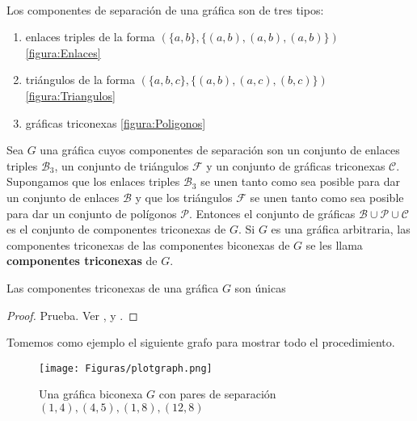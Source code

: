 \paragraph{}
Los componentes de separación de una gráfica son de tres tipos: 
\begin{enumerate}
\item enlaces triples de la forma $\left(\{a, b\}, \{\left(a, b\right),\left(a, b\right),\left(a, b\right)\} \right)$ \ref{figura:Enlaces}
\item triángulos de la forma $\left(\{a, b, c\}, \{\left(a, b\right),\left(a, c\right),\left(b, c\right)\}\right)$ \ref{figura:Triangulos}
\item gráficas triconexas \ref{figura:Poligonos}
\end{enumerate}
Sea $G$ una gráfica cuyos componentes de separación son un conjunto de enlaces triples $\mathscr{B}_{3}$, un conjunto de triángulos $\mathscr{F}$ y un conjunto de gráficas triconexas $\mathscr{C}$. Supongamos que los enlaces triples $\mathscr{B}_{3}$ se unen tanto como sea posible para dar un conjunto de enlaces $\mathscr{B}$ y que los triángulos $\mathscr{F}$ se unen tanto como sea posible para dar un conjunto de polígonos $\mathscr{P}$. Entonces el conjunto de gráficas $ \mathscr{B} \cup \mathscr{P} \cup \mathscr{C}$ es el conjunto de componentes triconexas de $G$. Si $G$ es una gráfica arbitraria, las componentes triconexas de las componentes biconexas de $G$ se les llama \textbf{componentes triconexas} de $G$.

\begin{lemma}
Las componentes triconexas de una gráfica $G$ son únicas
\label{lema:3.2}
\end{lemma}

\begin{proof}
Prueba. Ver \citep{mac-lane-1937}, \citep{jEdmonds} y \citep{tarjan-1972}.
\end{proof}

Tomemos como ejemplo el siguiente grafo para mostrar todo el procedimiento.
\begin{figure}[h]
\centering
\texttt{[image: Figuras/plotgraph.png]}
\caption{Una gráfica biconexa $G$ con pares de separación $(1, 4),(4, 5),(1, 8),(12, 8)$}
\label{figura:3.1}
\end{figure}

